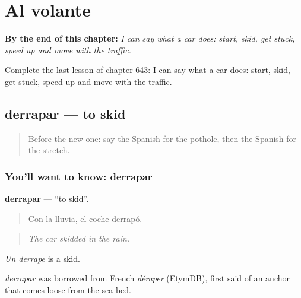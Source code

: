 
\chapter{Al volante}
\label{ch:es-al-volante}

\begin{chapteropening}
\textbf{By the end of this chapter:} \emph{I can say what a car does: start, skid, get stuck, speed up and move with the traffic.}

Complete the last lesson of chapter 643: I can say what a car does: start, skid, get stuck, speed up and move with the traffic.
\end{chapteropening}

\section[derrapar]{derrapar — to skid}

\label{lesson:ES-C643-derrapar}



\begin{quote}
Before the new one: say the Spanish for the pothole, then the Spanish for the stretch.
\end{quote}

\subsection*{You'll want to know: derrapar}
\textbf{derrapar} — \textquotedblleft{}to skid\textquotedblright{}.

\begin{quote}
Con la lluvia, el coche derrapó.
\end{quote}

\begin{quote}
\emph{The car skidded in the rain.}
\end{quote}

\emph{Un derrape} is a skid.

\begin{cousinweb}
\emph{derrapar} was borrowed from French \emph{déraper} (EtymDB), first said of an anchor that comes loose from the sea bed.
\end{cousinweb}

